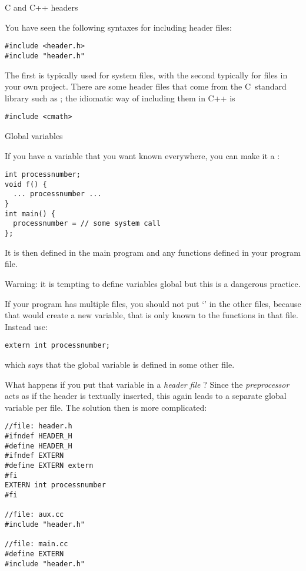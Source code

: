  {C and C++ headers}

You have seen the following syntaxes for including header files:
\begin{verbatim}
#include <header.h>
#include "header.h"
\end{verbatim}
The first is typically used for system files, with the second
typically for files in your own project. There are some header files
that come from the C~standard library such as ; the
idiomatic way of including them in C++ is
\begin{verbatim}
#include <cmath>
\end{verbatim}

 {Global variables}
\label{ex:globalvar}

If you have a variable that you want known everywhere, you can make it
a :
\begin{verbatim}
int processnumber;
void f() {
  ... processnumber ...
}
int main() {
  processnumber = // some system call
};
\end{verbatim}
It is then defined in the main program and any functions defined in your program file.

Warning: it is tempting to define variables global but this is a
dangerous practice.

If your program has multiple files, you should not put `'
in the other files, because that would create a new variable, that is
only known to the functions in that file. Instead use:
\begin{verbatim}
extern int processnumber;
\end{verbatim}
which says that the global variable  is defined in
some other file.

What happens if you put that variable in a
%
\emph{header file}%
%
? Since the
%
\emph{preprocessor}%
acts as if the header is textually inserted, this again leads to
a separate global variable per file. The solution then is more
complicated:
\begin{verbatim}
//file: header.h
#ifndef HEADER_H
#define HEADER_H
#ifndef EXTERN
#define EXTERN extern
#fi
EXTERN int processnumber
#fi

//file: aux.cc
#include "header.h"

//file: main.cc
#define EXTERN
#include "header.h"
\end{verbatim}

